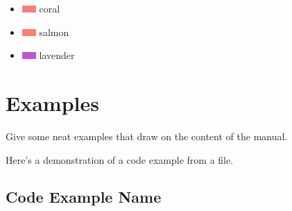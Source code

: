 \documentclass[10pt]{article}
\newcommand{\code}[2]{
    \hrulefill
    \subsection*{#1}
    
    \vspace{2em}
}
\begin{document}
\begin{itemize}
    \item \includegraphics{images/colors/coral.png} coral
    \item \includegraphics{images/colors/salmon.png} salmon
    \item \includegraphics{images/colors/lavender.png} lavender
\end{itemize}



\section*{Examples}
Give some neat examples that draw on the content of the manual.

Here's a demonstration of a code example from a file.

\code{Code Example Name}{examples/demo.py}
\end{document}
